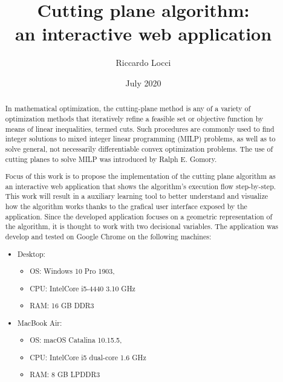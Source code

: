 \documentclass[9pt]{extarticle}
\title{Cutting plane algorithm: \\ an interactive web application}
\date{July 2020}
\author{Riccardo Locci}
\begin{document}
    \maketitle
        
    \begin{abstract} 
        In mathematical optimization, the cutting-plane method is any of a variety of optimization methods that iteratively 
        refine a feasible set or objective function by means of linear inequalities, termed cuts. 
        Such procedures are commonly used to find integer solutions to mixed integer linear programming (MILP) problems, 
        as well as to solve general, not necessarily differentiable convex optimization problems. The use of cutting planes 
        to solve MILP was introduced by Ralph E. Gomory.\cite{wiki:cuttingplane} 

        Focus of this work is to propose the implementation of the cutting plane algorithm as an interactive web application
        that shows the algorithm's execution flow step-by-step.
        This work will result in a auxiliary learning tool to better understand and visualize how the algorithm works
        thanks to the grafical user interface exposed by the application.
        Since the developed application focuses on a geometric representation of the algorithm, it is thought to work
        with two decisional variables.
        The application was develop and tested on Google Chrome on the following machines:
        
        \begin{itemize}
            \item Desktop:
            \begin{itemize} 
                \item OS: Windows 10 Pro 1903, 
                \item CPU: Intel\textregistered Core i5-4440 3.10 GHz
                \item RAM: 16 GB DDR3 
            \end{itemize}
            \item MacBook Air:
            \begin{itemize} 
                \item OS: macOS Catalina 10.15.5, 
                \item CPU: Intel\textregistered Core i5 dual-core 1.6 GHz
                \item RAM: 8 GB LPDDR3 
            \end{itemize}
        \end{itemize}
    \end{abstract}
\end{document}
